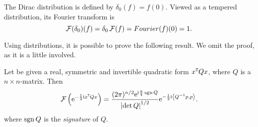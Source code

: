 \begin{nese}
The Dirac distribution is defined by $\delta_{0}(f)=f(0)$. Viewed as a tempered distribution, its Fourier transform is 
\[
\operatorname{\mathcal{F}}(\delta_{0})(f)=\delta_{0}\operatorname{\mathcal{F}}(f)=Fourier(f)(0)=1.
\]
\end{nese}


Using distributions, it is possible to prove the following result. We omit the proof, as it is a little involved.

\begin{nprop}
\label{prop:Fourier_imaginiary}
Let be given a real, symmetric and invertible quadratic form $x^{\operatorname{\mathtt{T}}}Qx$, where $Q$ is a $n\times n$-matrix. Then
\[
\operatorname{\mathcal{F}}\left(\mathrm{e}^{-\frac{1}{2}\mathrm{i} x^{\operatorname{\mathtt{T}}}Qx}\right)=\frac{(2\pi)^{n/2}\mathrm{e}^{\mathrm{i}\frac{\pi}{4}\operatorname{sgn} Q}}{\left| \det Q\right|^{1/2}}\mathrm{e}^{-\frac{1}{2}\mathrm{i}\left< Q^{-1}p,p\right>}.
\]
where $\operatorname{sgn} Q$ is the \emph{signature} of $Q$. 
\end{nprop}













